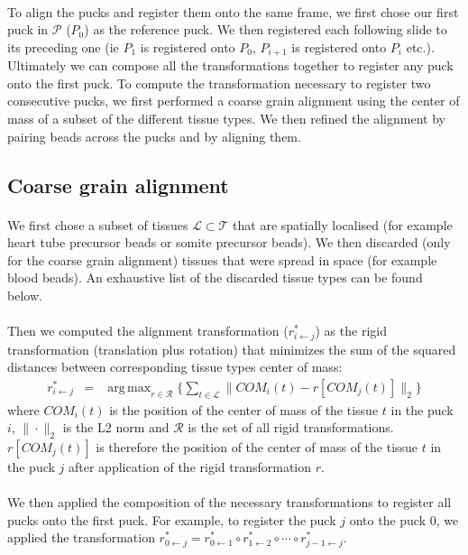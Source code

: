 \documentclass[10pt,a4paper]{article}
\DeclareMathOperator*{\argmax}{arg\,max}
\begin{document}
\paragraph{}To align the pucks and register them onto the same frame, we first chose our first puck in \(\mathcal{P}\) (\(P_0\)) as the reference puck.
We then registered each following slide to its preceding one (ie \(P_1\) is registered onto \(P_0\), \(P_{i+1}\) is registered onto \(P_{i}\) etc.).
Ultimately we can compose all the transformations together to register any puck onto the first puck.
To compute the transformation necessary to register two consecutive pucks, we first performed a coarse grain alignment using the center of mass of a subset of the different tissue types.
We then refined the alignment by pairing beads across the pucks and by aligning them.
\subsection{Coarse grain alignment}
\paragraph{}We first chose a subset of tissues \(\mathcal{L}\subset\mathcal{T}\) that are spatially localised (for example heart tube precursor beads or {somite precursor} beads).
We then discarded (only for the coarse grain alignment) tissues that were spread in space (for example {blood} beads).
An exhaustive list of the discarded tissue types can be found below.
\paragraph{}Then we computed the alignment transformation (\(r_{i\leftarrow j}^*\)) as the rigid transformation (translation plus rotation) that minimizes the sum of the squared distances between corresponding tissue types center of mass:
\begin{eqnarray}\label{eq:rigid}
r_{i\leftarrow j}^*&=&\argmax_{r\in\mathcal{R}} \big\{\sum_{t\in \mathcal{L}}\| COM_i(t)-r[COM_j(t)]\|_2\big\}
\end{eqnarray}
where \(COM_i(t)\) is the position of the center of mass of the tissue \(t\) in the puck \(i\), \(\|\cdot\|_2\) is the L2 norm and \(\mathcal{R}\) is the set of all rigid transformations.
\(r[COM_j(t)]\) is therefore the position of the center of mass of the tissue \(t\) in the puck \(j\) after application of the rigid transformation \(r\).
\paragraph{}We then applied the composition of the necessary transformations to register all pucks onto the first puck.
For example, to register the puck \(j\) onto the puck \(0\), we applied the transformation \(r_{0\leftarrow j}^*=r_{0\leftarrow 1}^*\circ r_{1\leftarrow 2}^*\circ \cdots \circ r_{j-1\leftarrow j}^*\).
\end{document}
